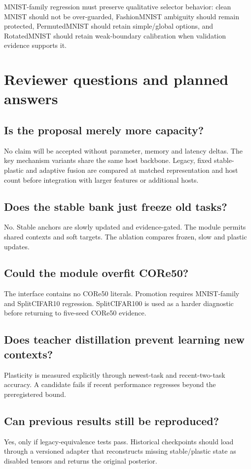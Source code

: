 \documentclass[10pt]{article}
\begin{document}
MNIST-family regression must preserve qualitative selector behavior: clean MNIST should not be over-guarded, FashionMNIST ambiguity should remain protected, PermutedMNIST should retain simple/global options, and RotatedMNIST should retain weak-boundary calibration when validation evidence supports it.

\section{Reviewer questions and planned answers}
\subsection*{Is the proposal merely more capacity?}
No claim will be accepted without parameter, memory and latency deltas. The key mechanism variants share the same host backbone. Legacy, fixed stable-plastic and adaptive fusion are compared at matched representation and host count before integration with larger features or additional hosts.

\subsection*{Does the stable bank just freeze old tasks?}
No. Stable anchors are slowly updated and evidence-gated. The module permits shared contexts and soft targets. The ablation compares frozen, slow and plastic updates.

\subsection*{Could the module overfit CORe50?}
The interface contains no CORe50 literals. Promotion requires MNIST-family and SplitCIFAR10 regression. SplitCIFAR100 is used as a harder diagnostic before returning to five-seed CORe50 evidence.

\subsection*{Does teacher distillation prevent learning new contexts?}
Plasticity is measured explicitly through newest-task and recent-two-task accuracy. A candidate fails if recent performance regresses beyond the preregistered bound.

\subsection*{Can previous results still be reproduced?}
Yes, only if legacy-equivalence tests pass. Historical checkpoints should load through a versioned adapter that reconstructs missing stable/plastic state as disabled tensors and returns the original posterior.
\end{document}
